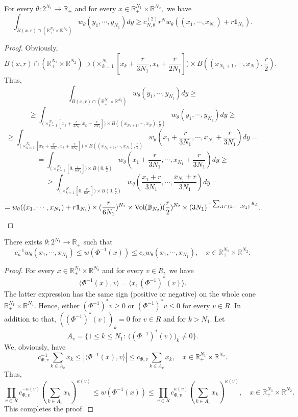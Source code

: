 \documentclass{amsart}
\begin{document}
\begin{lemma}\label{s2 lower estimate} For every $\theta:2^{N_1}\to\mathbb{R}_+$ and for every $x\in\mathbb{R}^{N_1}_+\times\mathbb{R}^{N_2},$ we have
$$\int_{B(x,r)\cap(\mathbb{R}^{N_1}_+\times\mathbb{R}^{N_2})}w_{\theta}(y_1,\cdots,y_{N_1})dy\geq c_{N,\theta}^{(2)}r^Nw_{\theta}((x_1,\cdots,x_{N_1})+r\mathbf{1}_{N_1}).$$
\end{lemma}
\begin{proof}
Obviously,
$$B(x,r)\cap(\mathbb{R}_+^{N_1}\times\mathbb{R}^{N_2})
\supset \Big(\times_{k=1}^{N_1}[x_k+\frac{r}{3N_1},x_k+\frac{r}{2N_1}]\Big)
\times B((x_{N_1+1},\cdots,x_N),\frac{r}{2}).$$
Thus,
$$\int_{B(x,r)\cap (\mathbb{R}_+^{N_1}\times\mathbb{R}^{N_2})}w_{\theta}(y_1,\cdots,y_{N_1})dy\geq$$
$$\geq \int_{\big(\times_{k=1}^{N_1}[x_k+\frac{r}{3N_1},x_k+\frac{r}{2N_1}]\big)
\times B((x_{N_1+1},\cdots,x_N),\frac{r}{2})}w_{\theta}(y_1,\cdots,y_{N_1})dy\geq $$
$$\geq \int_{\big(\times_{k=1}^{N_1}[x_k+\frac{r}{3N_1},x_k+\frac{r}{2N_1}]\big)\times B((x_{N_1+1},\cdots,x_N),\frac{r}{2})}w_{\theta}(x_1+\frac{r}{3N_1},\cdots,x_{N_1}+\frac{r}{3N_1})dy=$$
$$=\int_{\big(\times_{k=1}^{N_1}[0,\frac{r}{6N_1}]\big)\times  B(0,\frac{r}{2})}w_{\theta}(x_1+\frac{r}{3N_1},\cdots,x_{N_1}+\frac{r}{3N_1})dy\geq$$
$$\geq\int_{\big(\times_{k=1}^{N_1}[0,\frac{r}{6N_1}]\big)\times B(0,\frac{r}{2})}w_{\theta}(\frac{x_1+r}{3N_1},\cdots,\frac{x_{N_1}+r}{3N_1})dy=$$
$$=w_{\theta}((x_1,\cdots,x_{N_1})+r\mathbf{1}_{N_1})
\times(\frac{r}{6N_1})^{N_1}
\times {\rm Vol}(\mathbb{B}_{N_2})(\frac{r}{2})^{N_2}\times (3N_1)^{-\sum_{A\subset\{1,\cdots,N_1\}}\theta_A}.$$
\end{proof}


\begin{lemma}\label{s2 trivial lemma} There exists $\theta:2^{N_1}\to\mathbb{R}_+$ such that
$$c_{\kappa}^{-1}w_{\theta}(x_1,\cdots,x_{N_1})\leq w(\Phi^{-1}(x))\leq c_{\kappa}w_{\theta}(x_1,\cdots,x_{N_1}),\quad x\in\mathbb{R}_+^{N_1}\times\mathbb{R}^{N_2}.$$
\end{lemma}
\begin{proof}
For every $x\in\mathbb{R}^{N_1}_+\times\mathbb{R}^{N_2}$ and for every $v\in R,$ we have
$$\langle \Phi^{-1}(x),v\rangle=\langle x,(\Phi^{-1})^{\ast}(v)\rangle.$$
The latter expression has the same sign (positive or negative) on the whole cone $\mathbb{R}^{N_1}_+\times\mathbb{R}^{N_2}.$ Hence, either $(\Phi^{-1})^{\ast}v\geq0$ or $(\Phi^{-1})^{\ast}v\leq0$ for every $v\in R.$ In addition to that, $((\Phi^{-1})^{\ast}(v))_k=0$ for $v\in R$ and for $k>N_1.$ Let
$$A_v=\big\{1\leq k\leq N_1:\ \big((\Phi^{-1})^{\ast}(v)\big)_k\neq0\big\}.$$
We, obviously, have
$$c_{\Phi,v}^{-1}\sum_{k\in A_v}x_k\leq |\langle \Phi^{-1}(x),v\rangle|\leq c_{\Phi,v}\sum_{k\in A_v}x_k,\quad x\in \mathbb{R}^{N_1}_+\times\mathbb{R}^{N_2}.$$
Thus,
$$\prod_{v\in R}c_{\Phi,v}^{-\kappa(v)}(\sum_{k\in A_v}x_k)^{\kappa(v)}
\leq w(\Phi^{-1}(x))\leq
\prod_{v\in R}c_{\Phi,v}^{\kappa(v)}(\sum_{k\in A_v}x_k)^{\kappa(v)},\quad x\in\mathbb{R}_+^{N_1}\times\mathbb{R}^{N_2}.$$
This completes the proof.
\end{proof}
\end{document}
